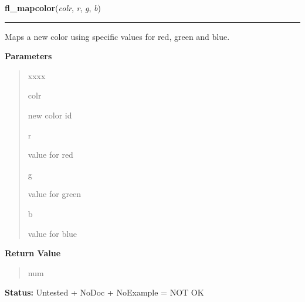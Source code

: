 \hspace{.8\funcindent}\begin{boxedminipage}{\funcwidth}

    \raggedright \textbf{fl\_mapcolor}(\textit{colr}, \textit{r}, \textit{g}, \textit{b})

    \vspace{-1.5ex}

    \rule{\textwidth}{0.5\fboxrule}
\setlength{\parskip}{2ex}
    Maps a new color using specific values for red, green and blue.

\setlength{\parskip}{1ex}
      \textbf{Parameters}
      \vspace{-1ex}

      \begin{quote}
        \begin{Ventry}{xxxx}

          \item[colr]

          new color id

          \item[r]

          value for red

          \item[g]

          value for green

          \item[b]

          value for blue

        \end{Ventry}

      \end{quote}

      \textbf{Return Value}
    \vspace{-1ex}

      \begin{quote}
      num

      \end{quote}

\textbf{Status:} Untested + NoDoc + NoExample = NOT OK



    \end{boxedminipage}

    \label{xformslib:library:fl_mapcolorname}

    \vspace{0.5ex}

